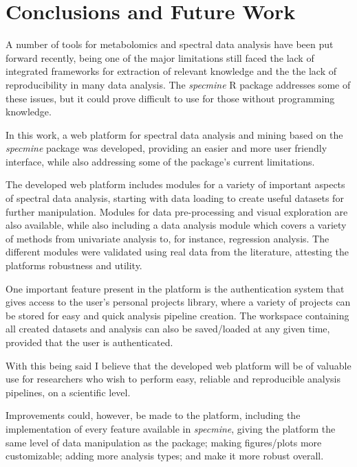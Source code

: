
\chapter{Conclusions and Future Work}

A number of tools for metabolomics and spectral data analysis have been put forward recently, being one of the major limitations still faced the lack of integrated frameworks for extraction of relevant knowledge and the the lack of reproducibility in many data analysis. The \textit{specmine} R package addresses some of these issues, but it could prove difficult to use for those without programming knowledge. 

In this work, a web platform for spectral data analysis and mining based on the \textit{specmine} package was developed, providing an easier and more user friendly interface, while also addressing some of the package's current limitations.

The developed web platform includes modules for a variety of important
aspects of spectral data analysis, starting with data loading to create useful datasets for further manipulation. Modules for data pre-processing and visual exploration are also available, while also including a data analysis module which covers a variety of methods from univariate analysis to, for instance, regression analysis. The different modules were validated using real data from the literature, attesting the platforms robustness and utility.

One important feature present in the platform is the authentication system that gives access to the user's personal projects library, where a variety of projects can be stored for easy and quick analysis pipeline creation. The workspace containing all created datasets and analysis can also be saved/loaded at any given time, provided that the user is authenticated.

With this being said I believe that the developed web platform will be of valuable use for researchers who wish to perform easy, reliable and reproducible analysis pipelines, on a scientific level.

Improvements could, however, be made to the platform, including the implementation of every feature available in \textit{specmine}, giving the platform the same level of data manipulation as the package; making figures/plots more customizable; adding more analysis types; and make it more robust overall.


